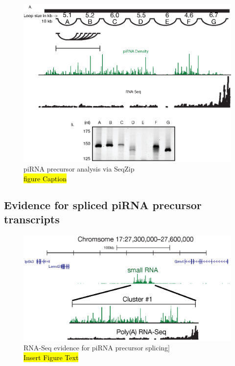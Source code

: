  \begin{figure} %
    \centering 
    \includegraphics{Figures/SeqZipMethod/piRNAPrecurserAnalyisBySeqZip.eps}
    \caption[piRNA precursor analysis via SeqZip]
    {
      piRNA precursor analysis via SeqZip\\[0.25cm]
      \hl{figure Caption}
    	}
    \label{SeqZipMethod:fig:Hiv tx via SeqZip}
  	\end{figure}

\subsection{Evidence for spliced piRNA precursor transcripts}\label{SeqZipMethod:subsec:piRNA precursors are spliced}

  \begin{figure} %
    \centering 
    \includegraphics{Figures/AppendixB/evidenceForPrecursorSplicing.eps}
    \caption[RNA-Seq evidence for piRNA precursor splicing]
    {
      RNA-Seq evidence for piRNA precursor splicing]\\[0.25cm]
      \hl{Insert Figure Text}
      }
    \label{SeqZipMethod:fig:evidence for precusor splicing}
    \end{figure}

